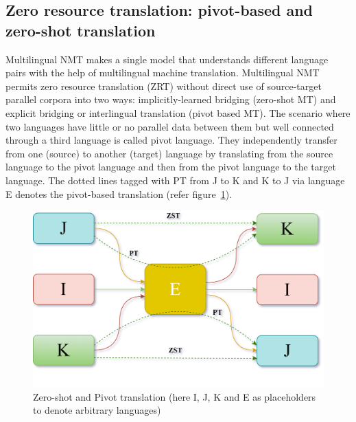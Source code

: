 \documentclass[manuscript,screen]{acmart}
\begin{document}
\subsection{Zero resource translation: pivot-based and zero-shot translation}
Multilingual NMT makes a single model that understands different language pairs with the help of multilingual machine translation. Multilingual NMT permits zero resource translation (ZRT) without direct use of source-target parallel corpora into two ways: implicitly-learned bridging (zero-shot MT) and explicit bridging or interlingual translation (pivot based MT).  
The scenario where two languages have little or no parallel data between them but well connected through a third language is called pivot language. They independently transfer from one (source) to another (target) language by translating from the source language to the pivot language and then from the pivot language to the target language. The dotted lines tagged with PT from J to K and K to J via language E denotes the pivot-based translation (refer figure~\ref{TL-ZST-PT}).

\begin{figure}[!h]
    \centering
    \includegraphics[width=0.6\linewidth]{ZSTPTcurved.png}
    \caption{Zero-shot and Pivot translation (here I, J, K and E 
    as placeholders to denote arbitrary languages)}
    \label{TL-ZST-PT}
\end{figure}
\end{document}
